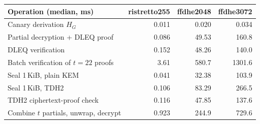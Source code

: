 \begin{tabular}{@{}lrrr@{}}
\toprule
Operation (median, ms) & ristretto255 & ffdhe2048 & ffdhe3072\\
\midrule
Canary derivation $H_G$ & 0.011 & 0.020 & 0.034\\
Partial decryption + DLEQ proof & 0.086 & 49.53 & 160.8\\
DLEQ verification & 0.152 & 48.26 & 140.0\\
Batch verification of $t=22$ proofs & 3.61 & 580.7 & 1301.6\\
Seal 1\,KiB, plain KEM & 0.041 & 32.38 & 103.9\\
Seal 1\,KiB, TDH2 & 0.106 & 83.29 & 266.5\\
TDH2 ciphertext-proof check & 0.116 & 47.85 & 137.6\\
Combine $t$ partials, unwrap, decrypt & 0.923 & 244.9 & 729.6\\
\bottomrule
\end{tabular}
